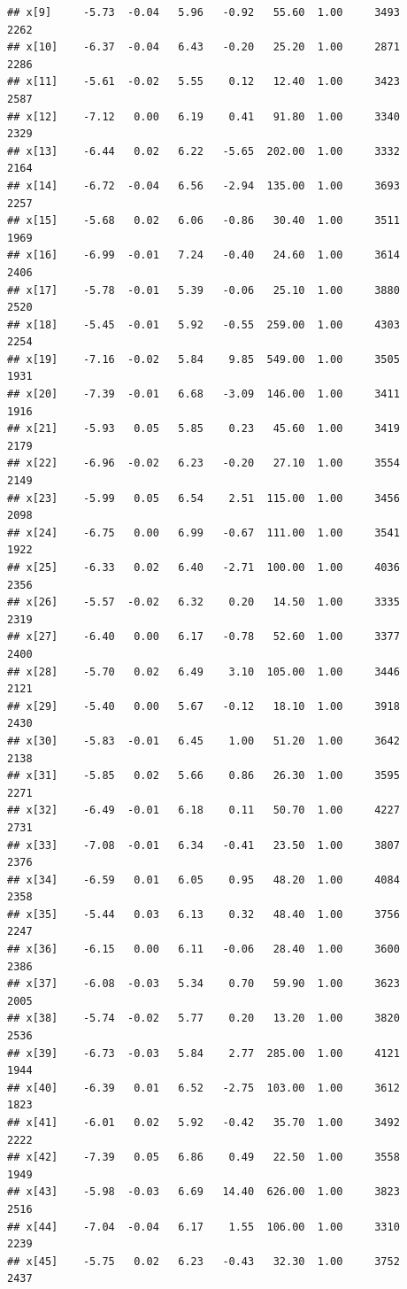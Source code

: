 \documentclass[american,]{article}
\begin{document}
\begin{verbatim}
## x[9]     -5.73  -0.04   5.96   -0.92   55.60  1.00     3493     2262
## x[10]    -6.37  -0.04   6.43   -0.20   25.20  1.00     2871     2286
## x[11]    -5.61  -0.02   5.55    0.12   12.40  1.00     3423     2587
## x[12]    -7.12   0.00   6.19    0.41   91.80  1.00     3340     2329
## x[13]    -6.44   0.02   6.22   -5.65  202.00  1.00     3332     2164
## x[14]    -6.72  -0.04   6.56   -2.94  135.00  1.00     3693     2257
## x[15]    -5.68   0.02   6.06   -0.86   30.40  1.00     3511     1969
## x[16]    -6.99  -0.01   7.24   -0.40   24.60  1.00     3614     2406
## x[17]    -5.78  -0.01   5.39   -0.06   25.10  1.00     3880     2520
## x[18]    -5.45  -0.01   5.92   -0.55  259.00  1.00     4303     2254
## x[19]    -7.16  -0.02   5.84    9.85  549.00  1.00     3505     1931
## x[20]    -7.39  -0.01   6.68   -3.09  146.00  1.00     3411     1916
## x[21]    -5.93   0.05   5.85    0.23   45.60  1.00     3419     2179
## x[22]    -6.96  -0.02   6.23   -0.20   27.10  1.00     3554     2149
## x[23]    -5.99   0.05   6.54    2.51  115.00  1.00     3456     2098
## x[24]    -6.75   0.00   6.99   -0.67  111.00  1.00     3541     1922
## x[25]    -6.33   0.02   6.40   -2.71  100.00  1.00     4036     2356
## x[26]    -5.57  -0.02   6.32    0.20   14.50  1.00     3335     2319
## x[27]    -6.40   0.00   6.17   -0.78   52.60  1.00     3377     2400
## x[28]    -5.70   0.02   6.49    3.10  105.00  1.00     3446     2121
## x[29]    -5.40   0.00   5.67   -0.12   18.10  1.00     3918     2430
## x[30]    -5.83  -0.01   6.45    1.00   51.20  1.00     3642     2138
## x[31]    -5.85   0.02   5.66    0.86   26.30  1.00     3595     2271
## x[32]    -6.49  -0.01   6.18    0.11   50.70  1.00     4227     2731
## x[33]    -7.08  -0.01   6.34   -0.41   23.50  1.00     3807     2376
## x[34]    -6.59   0.01   6.05    0.95   48.20  1.00     4084     2358
## x[35]    -5.44   0.03   6.13    0.32   48.40  1.00     3756     2247
## x[36]    -6.15   0.00   6.11   -0.06   28.40  1.00     3600     2386
## x[37]    -6.08  -0.03   5.34    0.70   59.90  1.00     3623     2005
## x[38]    -5.74  -0.02   5.77    0.20   13.20  1.00     3820     2536
## x[39]    -6.73  -0.03   5.84    2.77  285.00  1.00     4121     1944
## x[40]    -6.39   0.01   6.52   -2.75  103.00  1.00     3612     1823
## x[41]    -6.01   0.02   5.92   -0.42   35.70  1.00     3492     2222
## x[42]    -7.39   0.05   6.86    0.49   22.50  1.00     3558     1949
## x[43]    -5.98  -0.03   6.69   14.40  626.00  1.00     3823     2516
## x[44]    -7.04  -0.04   6.17    1.55  106.00  1.00     3310     2239
## x[45]    -5.75   0.02   6.23   -0.43   32.30  1.00     3752     2437

\end{verbatim}
\end{document}
